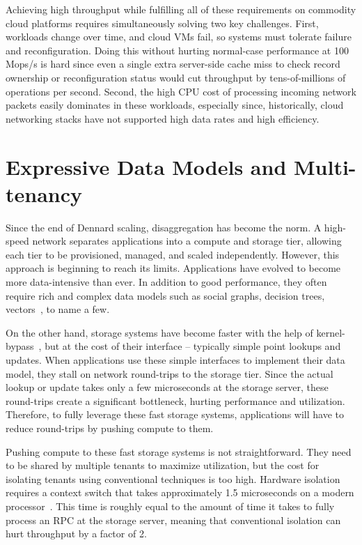 Achieving high throughput while fulfilling all of these requirements on
commodity cloud platforms requires simultaneously solving two key
challenges.
%
First, workloads change over time, and cloud VMs fail, so
systems must tolerate failure and reconfiguration.
%
Doing this without
hurting normal-case performance at 100 Mops/s is hard since even a
single extra server-side cache miss to check record ownership or
reconfiguration status would cut throughput by tens-of-millions of
operations per second.
%
Second, the high CPU cost of processing incoming
network packets easily dominates in these workloads, especially since,
historically, cloud networking stacks have not supported high data rates
and high efficiency.

\section{Expressive Data Models and Multi-tenancy}

Since the end of Dennard scaling, disaggregation has become the norm.
%
A high-speed network separates applications into a compute and
storage tier, allowing each tier to be
provisioned, managed, and scaled independently.
%
However, this approach
is beginning to reach its limits.
%
Applications have evolved to become more data-intensive than ever.
%
In addition to good performance, they often require rich and complex
data models such as social graphs, decision trees,
vectors~\cite{fb-memcache,parameter-server}, to name a few.

On the other hand, storage systems have become faster with the help of
kernel-bypass~\cite{ramcloud,farm-txns}, but at the cost of their
interface – typically simple point lookups and updates.
%
When applications use these simple interfaces to implement their data
model, they stall on network round-trips to the
storage tier.
%
Since the actual lookup or update takes only a few
microseconds at the storage server, these round-trips create a
significant
bottleneck, hurting performance and utilization.
%
Therefore, to fully
leverage these fast storage systems, applications will have to reduce
round-trips by pushing compute to them.

Pushing compute to these fast storage systems is
not straightforward.
%
They need to be shared by multiple tenants to maximize utilization,
but the cost for isolating tenants using conventional techniques is too
high.
%
Hardware isolation
requires a context switch that takes approximately
1.5 microseconds on a modern processor~\cite{splinter}.
%
This time
is roughly equal to the amount of time it takes to
fully process an RPC at the storage server, meaning
that conventional isolation can hurt throughput by
a factor of 2.

